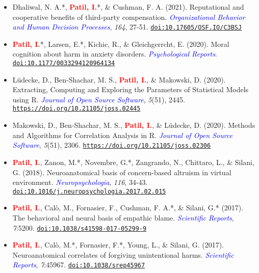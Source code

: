 \documentclass[10pt]{article}
\begin{document}
\begin{itemize}
	\item Dhaliwal, N. A.*, \textbf{\textcolor{red}{Patil, I.}}*, \& Cushman, F. A. (2021). Reputational and cooperative benefits of third-party compensation. \textit{\textcolor{blue}{Organizational Behavior and Human Decision Processes}}, \textit{164}, 27-51. \href{https://www.researchgate.net/publication/349073655_Reputational_and_cooperative_benefits_of_third-party_compensation}{\tt doi:10.17605/OSF.IO/C3BSJ}
	
	\item  \textbf{\textcolor{red}{Patil, I.}}*, Larsen, E.*, Kichic, R., \& Gleichgerrcht, E. (2020). Moral cognition about harm in anxiety  disorders. \textit{\textcolor{blue}{Psychological Reports}}. \href{https://psyarxiv.com/g5p7v/}{\tt doi:10.1177/0033294120964134}
	
    \item Lüdecke, D., Ben-Shachar,  M. S., \textbf{\textcolor{red}{Patil, I.}}, \& Makowski, D. (2020). Extracting, Computing and Exploring the Parameters of Statistical Models using R. \textit{\textcolor{blue}{Journal of Open Source Software}}, \textit{5}(51), 2445. \href{https://joss.theoj.org/papers/10.21105/joss.02445}{\tt https://doi.org/10.21105/joss.02445}
	
    \item Makowski, D., Ben-Shachar,  M. S., \textbf{\textcolor{red}{Patil, I.}}, \& Lüdecke, D. (2020). Methods and Algorithms for Correlation Analysis in R. \textit{\textcolor{blue}{Journal of Open Source Software}}, \textit{5}(51), 2306. \href{https://joss.theoj.org/papers/10.21105/joss.02306}{\tt https://doi.org/10.21105/joss.02306}
	
	\item \textbf{\textcolor{red}{Patil, I.}}, Zanon, M.*, Novembre, G.*, Zangrando, N., Chittaro, L., \& Silani, G. (2018). Neuroanatomical basis of concern-based altruism in virtual environment. \textit{\textcolor{blue}{Neuropsychologia}}, \textit{116}, 34-43. \href{https://drive.google.com/open?id=0B6_u70YpdJKnWU0zblpBOUMxRXc}{\tt doi:10.1016/j.neuropsychologia.2017.02.015}
		
	\item \textbf{\textcolor{red}{Patil, I.}}, Cal\`{o}, M., Fornasier, F., Cushman, F. A.*, \& Silani, G.* (2017). The behavioral and neural basis of empathic blame. 
 \textit{\textcolor{blue}{Scientific Reports}}, \textit{7}:5200. \href{https://drive.google.com/open?id=0B6_u70YpdJKnT1J6dkk5R1NPZDg}{\tt doi:10.1038/s41598-017-05299-9}
	
	\item \textbf{\textcolor{red}{Patil, I.}}, Cal\`{o}, M.*, Fornasier, F.*, Young, L., \& Silani, G. (2017). Neuroanatomical correlates of forgiving unintentional harms. \textit{\textcolor{blue}{Scientific Reports}}, \textit{7}:45967. \href{https://drive.google.com/open?id=0B6_u70YpdJKnRV81UnNlZHdrdXM}{\tt doi:10.1038/srep45967}
	

\end{itemize}
\end{document}
